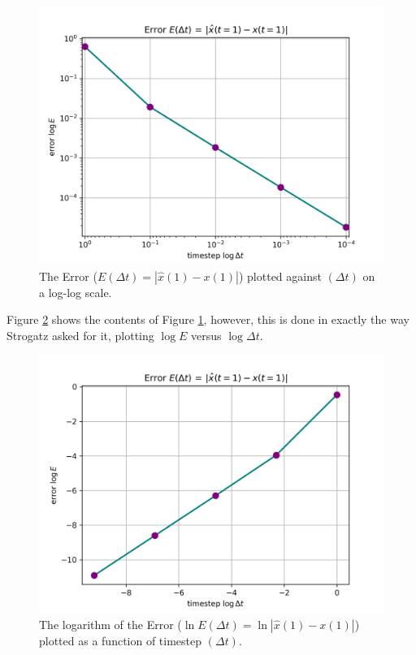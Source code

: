 \documentclass[draft]{agujournal2019}
\begin{document}
\begin{figure}[b]
    \includegraphics[width=.91\linewidth]{figs/figure2.8.3.c.ii.png}
    \centering
    \caption{The Error ($E(\Delta t) = |\hat{x}(1)-x(1)|$) plotted against $(\Delta t)$ on a log-log scale. }
    \label{fig:p5cii}
\end{figure}
Figure \ref{fig:p5cii-2} shows the contents of Figure \ref{fig:p5cii}, however, this is done in exactly the way Strogatz asked for it, plotting $\log{E}$ versus $\log{\Delta t}$.

\begin{figure}[b]
    \includegraphics[width=.91\linewidth]{figs/figure2.8.3.c.ii-2.png}
    \centering
    \caption{The logarithm of the Error ($\ln{E}(\Delta t) = \ln|\hat{x}(1)-x(1)|$) plotted as a function of timestep $(\Delta t)$. }
    \label{fig:p5cii-2}
\end{figure}
\end{document}
